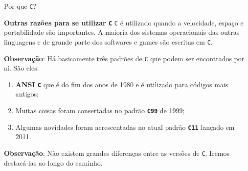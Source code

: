 \documentclass{beamer}
\newcommand{\C}{\texttt{C}}
\begin{document}
\begin{frame}{Por que \C?}
\begin{block}{\textbf{Outras razões para se utilizar \C}}
\texttt{C} é utilizado quando a velocidade, espaço e portabilidade são importantes. A maioria dos sistemas operacionais das outras linguagens e de grande parte dos softwares e games são escritas em \C.
\end{block}
\textbf{Observação}: Há basicamente três padrões de \texttt{C} que podem ser encontrados por aí. São eles:
\begin{enumerate}
	\item \textbf{ANSI \texttt{C}} que é do fim dos anos de 1980 e é utilizado para códigos mais antigos;
	\item Muitas coisas foram consertadas no padrão \textbf{\texttt{C99}} de 1999;
	\item Algumas novidades foram acrescentadas no atual padrão \textbf{\texttt{C11}} lançado em 2011.   
\end{enumerate}
\textbf{Observação}: Não existem grandes diferenças entre as versões de \texttt{C}. Iremos destacá-las ao longo do caminho.
\end{frame}

\end{document}
